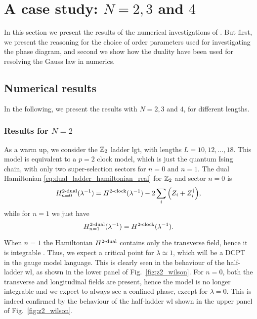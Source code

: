 \section{A case study: \texorpdfstring{$N=2, 3$}{N=2, 3} and \texorpdfstring{$4$}{4}}
\label{sec:a_case_study_N_2_3_4}


In this section we present the results of the numerical investigations of \cite{pradhan2022ladder}.
But first, we present the reasoning for the choice of order parameters used for investigating the phase diagram, and second we show how the duality have been used for resolving the Gauss law in numerics.








\subsection{Numerical results}
\label{sub:numerical_results}

In the following, we present the results with $N=2,3$ and $4$, for different lengths.

\subsubsection*{Results for \texorpdfstring{$N=2$}{N=2}}

As a warm up, we consider the $\Z_2$ ladder \ac{lgt}, with lengths $L=10,12,\dots,18$.
This model is equivalent to a $p=2$ clock model, which is just the quantum Ising chain, with only two super-selection sectors for $n=0$ and $n=1$.
The dual Hamiltonian \eqref{eq:dual_ladder_hamiltonian_real} for $\Z_2$ and sector $n=0$ is
\begin{equation}
    \HamilDual[2]_{n=0}(\lambda^{-1}) = \HamilClock[2](\lambda^{-1}) - 2 \sum_{i} \qty( Z_i + Z_i^{\dagger} ),
\end{equation}
while for $n=1$ we just have
\begin{equation}
    \HamilDual[2]_{n=1}(\lambda^{-1}) = \HamilClock[2](\lambda^{-1}).
\end{equation}

When $n=1$ the Hamiltonian $\HamilDual[2]$ contains only the transverse field, hence it is integrable \cite{baxter1982exactlysm}.
Thus, we expect a critical point for $\lambda \simeq 1$, which will be a DCPT in the gauge model language.
This is clearly seen in the behaviour of the half-ladder \ac{wl}, as shown in the lower panel of Fig.~\ref{fig:z2_wilson}.
For $n=0$, both the transverse and longitudinal fields  are present, hence the model is no longer integrable \cite{banuls2011thermalization, kormos2017confinement, pomponio2022bloch} and we expect to always see a confined phase, except for $\lambda = 0$.
This is indeed confirmed by the behaviour of the half-ladder \ac{wl} shown in the upper panel of Fig.~\ref{fig:z2_wilson}.


